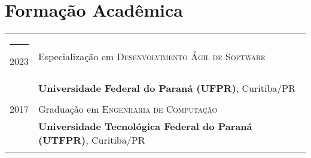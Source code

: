\documentclass[a4paper,12pt]{article}
\newcommand{\preheadingspacing}{\vspace{6pt}}
\newcommand{\postheadingspacing}{\vspace{6pt}}
\begin{document}
\preheadingspacing
\section{Formação Acadêmica}
\postheadingspacing
\begin{tabular}{rl}
\rule{3.2cm}{0pt} 2023 & Especialização em \textsc{Desenvolvimento Ágil de Software} \\ &\normalsize\textbf{Universidade Federal do Paraná (UFPR)}, Curitiba/PR\\&\\
2017 & Graduação em \textsc{Engenharia de Computação} \\ &\normalsize\textbf{Universidade Tecnológica Federal do Paraná (UTFPR)}, Curitiba/PR\\&\\
\end{tabular}

\end{document}
